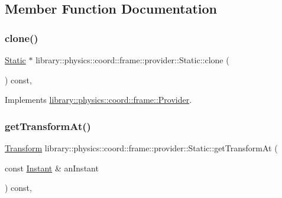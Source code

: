 \subsection{Member Function Documentation}
\mbox{\label{classlibrary_1_1physics_1_1coord_1_1frame_1_1provider_1_1_static_aa9062e601039a575302ea34e87e4dedc}} 
\subsubsection{\texorpdfstring{clone()}{clone()}}
{\footnotesize\ttfamily \hyperlink{classlibrary_1_1physics_1_1coord_1_1frame_1_1provider_1_1_static}{Static} $\ast$ library\+::physics\+::coord\+::frame\+::provider\+::\+Static\+::clone (\begin{DoxyParamCaption}{ }\end{DoxyParamCaption}) const\hspace{0.3cm}{\ttfamily [override]}, {\ttfamily [virtual]}}



Implements \hyperlink{classlibrary_1_1physics_1_1coord_1_1frame_1_1_provider_ab8eee40c8ef4aee0b57bedf458f4934e}{library\+::physics\+::coord\+::frame\+::\+Provider}.

\mbox{\label{classlibrary_1_1physics_1_1coord_1_1frame_1_1provider_1_1_static_a0999bb357a22d2e626aeaae81031fd46}} 
\subsubsection{\texorpdfstring{get\+Transform\+At()}{getTransformAt()}}
{\footnotesize\ttfamily \hyperlink{classlibrary_1_1physics_1_1coord_1_1_transform}{Transform} library\+::physics\+::coord\+::frame\+::provider\+::\+Static\+::get\+Transform\+At (\begin{DoxyParamCaption}\item[{const \hyperlink{classlibrary_1_1physics_1_1time_1_1_instant}{Instant} \&}]{an\+Instant }\end{DoxyParamCaption}) const\hspace{0.3cm}{\ttfamily [override]}, {\ttfamily [virtual]}}



